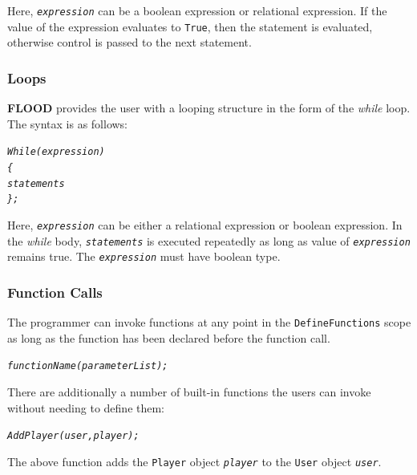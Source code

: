 \documentclass[12pt]{report}
\begin{document}
Here, \textit{\texttt{expression}} can be a boolean expression or relational expression. If the value of the expression evaluates to \texttt{True}, then the statement is evaluated, otherwise control is passed to the next statement.

\subsubsection{Loops}

\textbf{FLOOD} provides the user with a looping structure in the form of the \textit{while} loop. The syntax is as follows:

\begin{alltt}\begin{singlespace}
            \textit{While (expression)
            \{
                statements
            \};}\end{singlespace}
\end{alltt}

Here, \textit{\texttt{expression}} can be either a relational expression or boolean expression. In the \textit{while} body, \textit{\texttt{statements}} is executed repeatedly as long as value of \textit{\texttt{expression}} remains true. The \textit{\texttt{expression}} must have boolean type.

\subsubsection{Function Calls}

The programmer can invoke functions at any point in the \texttt{DefineFunctions} scope as long as the function has been declared before the function call. 

\begin{alltt}\begin{singlespace}
            \textit{functionName(parameterList);}\end{singlespace}
\end{alltt}

There are additionally a number of built-in functions the users can invoke without needing to define them:

\begin{alltt}\begin{singlespace}
            \textit{AddPlayer(user, player);}\end{singlespace}
\end{alltt}

The above function adds the \texttt{Player} object \textit{\texttt{player}} to the \texttt{User} object \textit{\texttt{user}}.
\end{document}
